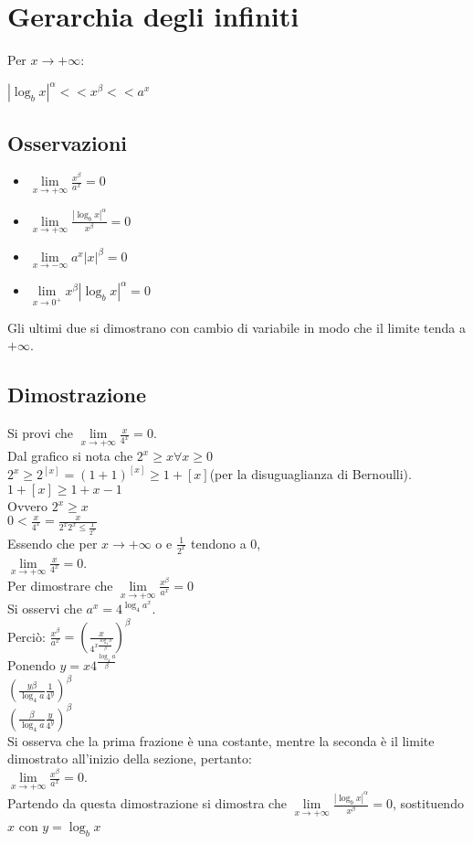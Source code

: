 \chapter{Gerarchia degli infiniti}
Per $x\rightarrow+\infty$: \\
\begin{center}
$|\log_b x|^\alpha<<x^\beta<<a^x$
\end{center}
\section{Osservazioni}
\begin{itemize}
\item $\lim\limits_{x\rightarrow+\infty}\frac{x^\beta}{a^x}=0$
\item $\lim\limits_{x\rightarrow+\infty} \frac{|\log_b x|^\alpha}{x^\beta}=0$
\item $\lim\limits_{x\rightarrow-\infty} a^x|x|^\beta=0$
\item $\lim\limits_{x\rightarrow 0^+} x^\beta|\log_b x|^\alpha=0$
\end{itemize}
Gli ultimi due si dimostrano con cambio di variabile in modo che il limite tenda a $+\infty$.
\section{Dimostrazione}
Si provi che $\lim\limits_{x\rightarrow+\infty}\frac{x}{4^x}=0$.\\
Dal grafico si nota che $2^x\ge x\forall x\ge 0$\\
$2^x\ge 2^{[x]}=(1+1)^{[x]}\ge 1+[x]$(per la disuguaglianza di Bernoulli).\\
$1+[x]\ge 1+x-1$\\
Ovvero $2^x\ge x$\\
$0<\frac{x}{4^x}=\frac{x}{2^x2^x\le \frac{1}{2^x}}$\\
Essendo che per $x\rightarrow +\infty$ o e $\frac{1}{2^x}$ tendono a 0,\\
$\lim\limits_{x\rightarrow+\infty}\frac{x}{4^x}=0$.\\
Per dimostrare che $\lim\limits_{x\rightarrow+\infty}\frac{x^\beta}{a^x}=0$\\
Si osservi che $a^x=4^{\log_4 a^x}$.\\
Perci\`o: $\frac{x^\beta}{a^x}=(\frac{x}{4^{x\frac{\log_4 a}{\beta}}})^\beta$\\
Ponendo $y=x4^{\frac{\log_4 a}{\beta}}$\\
$(\frac{y\beta}{\log_4 a}\frac{1}{4^y})^\beta$\\
$(\frac{\beta}{\log_4 a}\frac{y}{4^y})^\beta$\\
Si osserva che la prima frazione \`e una costante, mentre la seconda \`e il limite dimostrato all'inizio della sezione, pertanto:\\
$\lim\limits_{x\rightarrow+\infty}\frac{x^\beta}{a^x}=0$.\\
Partendo da questa dimostrazione si dimostra che $\lim\limits_{x\rightarrow+\infty} \frac{|\log_b x|^\alpha}{x^\beta}=0$, sostituendo $x$ con $y=\log_b x$
